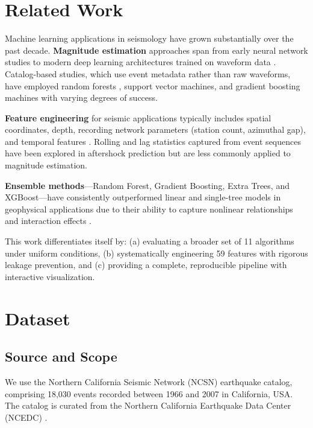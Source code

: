 \documentclass[journal,10pt,twocolumn]{IEEEtran}
\begin{document}
\section{Related Work}
\label{sec:related}

Machine learning applications in seismology have grown substantially over the past decade. \textbf{Magnitude estimation} approaches span from early neural network studies \cite{mousavi2020} to modern deep learning architectures trained on waveform data \cite{perol2018}. Catalog-based studies, which use event metadata rather than raw waveforms, have employed random forests \cite{derakhshani2013}, support vector machines, and gradient boosting machines with varying degrees of success.

\textbf{Feature engineering} for seismic applications typically includes spatial coordinates, depth, recording network parameters (station count, azimuthal gap), and temporal features \cite{asim2018}. Rolling and lag statistics captured from event sequences have been explored in aftershock prediction but are less commonly applied to magnitude estimation.

\textbf{Ensemble methods}—Random Forest, Gradient Boosting, Extra Trees, and XGBoost—have consistently outperformed linear and single-tree models in geophysical applications due to their ability to capture nonlinear relationships and interaction effects \cite{bergen2019}.

This work differentiates itself by: (a) evaluating a broader set of 11 algorithms under uniform conditions, (b) systematically engineering 59 features with rigorous leakage prevention, and (c) providing a complete, reproducible pipeline with interactive visualization.

\section{Dataset}
\label{sec:data}

\subsection{Source and Scope}

We use the Northern California Seismic Network (NCSN) earthquake catalog, comprising 18,030 events recorded between 1966 and 2007 in California, USA. The catalog is curated from the Northern California Earthquake Data Center (NCEDC) \cite{ncedc}.
\end{document}
